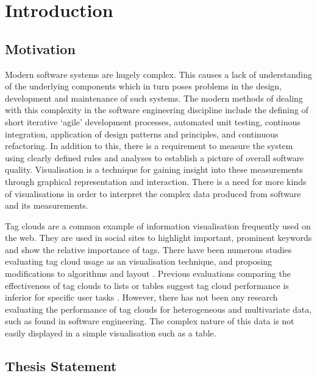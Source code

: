 \chapter{Introduction}
\ifpdf
    \graphicspath{{Introduction/IntroductionFigs/PNG/}{Introduction/IntroductionFigs/PDF/}{Introduction/IntroductionFigs/}}
\else
    \graphicspath{{Introduction/IntroductionFigs/EPS/}{Introduction/IntroductionFigs/}}
\fi

\section{Motivation}
Modern software systems are hugely complex. This causes a lack of understanding of the underlying components which in turn poses problems in the design, development and maintenance of such systems. The modern methods of dealing with this complexity in the software engineering discipline include the defining of short iterative `agile' development processes, automated unit testing, continous integration, application of design patterns and principles, and continuous refactoring. In addition to this, there is a requirement to measure the system using clearly defined rules and analyses to establish a picture of overall software quality. Visualisation is a technique for gaining insight into these measurements through graphical representation and interaction. There is a need for more kinds of visualisations in order to interpret the complex data produced from software and its measurements.

Tag clouds are a common example of information visualisation frequently used on the web. They are used in social sites to highlight important, prominent keywords and show the relative importance of tags. There have been numerous studies evaluating tag cloud usage as an visualisation technique, and proposing modifications to algorithms and layout \citep[e.g.][]{rivadeneira07, rivadeneira07, Oosterman10, lee10}.  Previous evaluations comparing the effectiveness of tag clouds to lists or tables suggest tag cloud performance is inferior for specific user tasks \cite{Oosterman10}. However, there has not been any research evaluating the performance of tag clouds for heterogeneous and multivariate data, such as found in software engineering. The complex nature of this data is not easily displayed in a simple visualisation such as a table.

\section{Thesis Statement}

